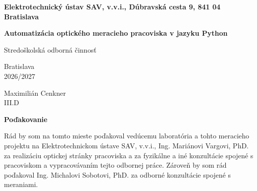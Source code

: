 \documentclass[12pt,a4paper]{article}
\begin{document}
\begin{titlepage}
    \begin{center}
        {\fontsize{14pt}{18pt}\selectfont \textbf{Elektrotechnický ústav SAV, v.v.i., Dúbravská cesta 9, 841 04 Bratislava}}
        
        \vspace{10cm}
        
        {\fontsize{16pt}{20pt}\selectfont \textbf{Automatizácia optického meracieho pracoviska v jazyku Python}}
        
        \vspace{1cm}
        {\fontsize{12pt}{16pt}\selectfont Stredoškolská odborná činnosť}
    \end{center}

    \vspace*{\fill}

    \noindent
    \begin{minipage}[t]{0.45\textwidth}
        \fontsize{12pt}{16pt}\selectfont
        Bratislava \\
        2026/2027
    \end{minipage}%
    \begin{minipage}[t]{0.55\textwidth}
        \raggedleft
        \fontsize{12pt}{16pt}\selectfont
        Maximilián Cenkner\\
        III.D
    \end{minipage}

\end{titlepage}

\newpage
\vspace*{\fill}
\noindent\textbf{Poďakovanie}

\noindent Rád by som na tomto mieste poďakoval vedúcemu laboratória a tohto meracieho projektu na Elektrotechnickom ústave SAV, v.v.i., Ing. Mariánovi Vargovi, PhD. za realizáciu optickej stránky pracoviska a za fyzikálne a iné konzultácie spojené s pracoviskom a vypracovávaním tejto odbornej práce. Zároveň by som rád poďakoval Ing. Michalovi Sobotovi, PhD. za odborné konzultácie spojené s meraniami.
\vspace{2cm}
\thispagestyle{empty}


\newpage
\tableofcontents
\thispagestyle{empty}
\newpage
\end{document}
